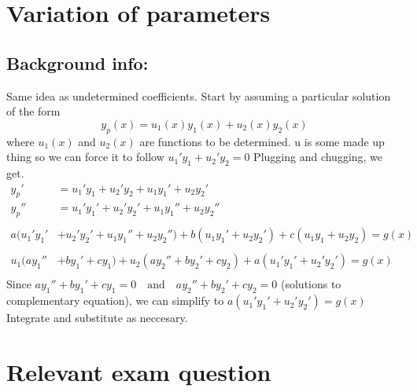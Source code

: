 \documentclass{article}
\begin{document}
\hypertarget{variationofparameters}{
    \section*{Variation of parameters}
    \subsection*{Background info:}
    Same idea as undetermined coefficients. Start by assuming a particular solution of the form
	\begin{equation*}
	y_p(x) = u_1(x)y_1(x) + u_2(x)y_2(x) 
	\end{equation*}
	where $u_1(x)$ and $u_2(x)$ are functions to be determined. u is some made up thing so we can force it to follow $u_1' y_1 + u_2' y_2 = 0$
	Plugging and chugging, we get.
	\begin{align*}
		y_p' &= u_1' y_1 + u_2' y_2 + u_1 y_1' + u_2 y_2' \\
		y_p'' &= u_1' y_1' + u_2' y_2' + u_1 y_1'' + u_2 y_2'' \\
		\\
		a(u_1' y_1' &+ u_2' y_2' + u_1 y_1'' + u_2 y_2'')  + b(u_1 y_1' + u_2 y_2') + c(u_1 y_1 + u_2 y_2) = g(x) \\
		\\
		u_1(ay_1'' &+ by_1' + cy_1) + u_2(ay_2'' + by_2' + cy_2) + a(u_1' y_1' + u_2' y_2') = g(x)\\
		\end{align*} 
		Since $ay_1'' + by_1' + cy_1 = 0 \quad \text{and} \quad ay_2'' + by_2' + cy_2 = 0$ (solutions to complementary equation), we can simplify to 
		$a(u_1' y_1' + u_2' y_2') = g(x)$
Integrate and substitute as neccesary.
}
\section*{Relevant exam question}\label{123}
\end{document}
